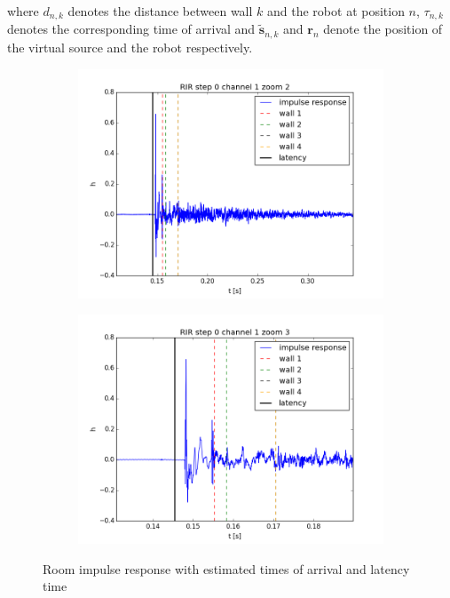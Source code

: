 where $d_{n,k}$ denotes the distance between wall $k$ and the robot at position $n$, $\tau_{n,k}$ denotes the corresponding time of arrival and $\tilde{\mathbf{s}}_{n,k}$ and $\mathbf{r}_{n}$ denote the position of the virtual source and the robot respectively. 

\begin{figure}[htb]
	\centering		
	\begin{subfigure}[b]{0.49\linewidth}
        \centering
		\includegraphics[width=\linewidth]{files/0_1_RIR_zoom2.png}
	\end{subfigure} 
	\begin{subfigure}[b]{0.49\linewidth}
        \centering
		\includegraphics[width=\linewidth]{files/0_1_RIR_zoom3.png}
	\end{subfigure}
	\caption{Room impulse response with estimated times of arrival and latency time} 
	\label{fig:RIR_zooms}
\end{figure}


